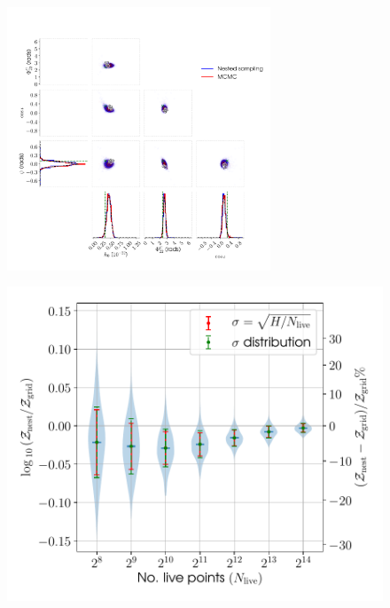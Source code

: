 \begin{figure}[phtb]
\begin{center}
\includegraphics[width=0.7\textwidth]{./figures/codeeval/simulations/signal_multidet/simulatedsignalmultitest}
\caption{ \protect}
\end{center}
\end{figure}


\begin{figure}[!phtb]
\begin{center}
\includegraphics[width=1\columnwidth]{./figures/codeeval/stats/nest_evs/nest_evs}
\caption{ \protect}
\end{center}
\end{figure}


